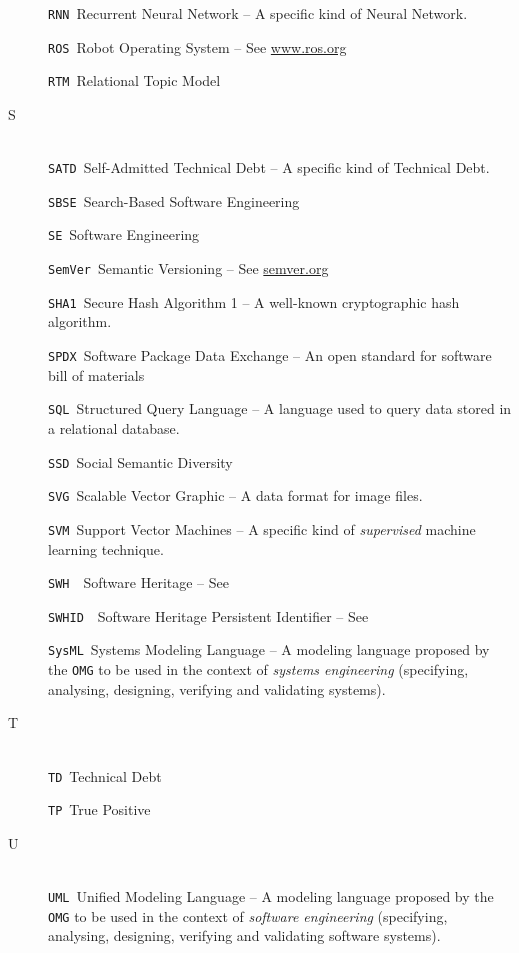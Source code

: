 \begin{description}
\verb|RNN|\quad~Recurrent Neural Network -- A specific kind of Neural Network. %

\verb|ROS|\quad~Robot Operating System -- See \url{www.ros.org}

\verb|RTM|\quad~Relational Topic Model


\item[S]~\\
\verb|SATD|\quad~Self-Admitted Technical Debt -- A specific kind of Technical Debt. %

\verb|SBSE|\quad~Search-Based Software Engineering

\verb|SE|\quad~Software Engineering

\verb|SemVer|\quad~Semantic Versioning -- See \url{semver.org}

\verb|SHA1|\quad~Secure Hash Algorithm 1 -- A well-known cryptographic hash algorithm.

\verb|SPDX|\quad~Software Package Data Exchange -- An open standard for software bill of materials

\verb|SQL|\quad~Structured Query Language -- A language used to query data stored in a relational database.

\verb|SSD|\quad~Social Semantic Diversity

\verb|SVG|\quad~Scalable Vector Graphic -- A data format for image files.

\verb|SVM|\quad~Support Vector Machines -- A specific kind of \emph{supervised} machine learning %
technique.

\verb|SWH|~\quad~Software Heritage -- See 

\verb|SWHID|~\quad~Software Heritage Persistent Identifier -- See 

\verb|SysML|\quad~Systems Modeling Language -- A modeling language proposed by the \verb|OMG| to be used in the context of \emph{systems engineering} (\ie specifying, analysing, designing, verifying and validating systems).


\item[T]~\\
\verb|TD|\quad~Technical Debt

\verb|TP|\quad~True Positive


\item[U]~\\
\verb|UML|\quad~Unified Modeling Language -- A modeling language proposed by the \verb|OMG| to be used in the context of \emph{software engineering} (\ie specifying, analysing, designing, verifying and validating software systems).


\end{description}
